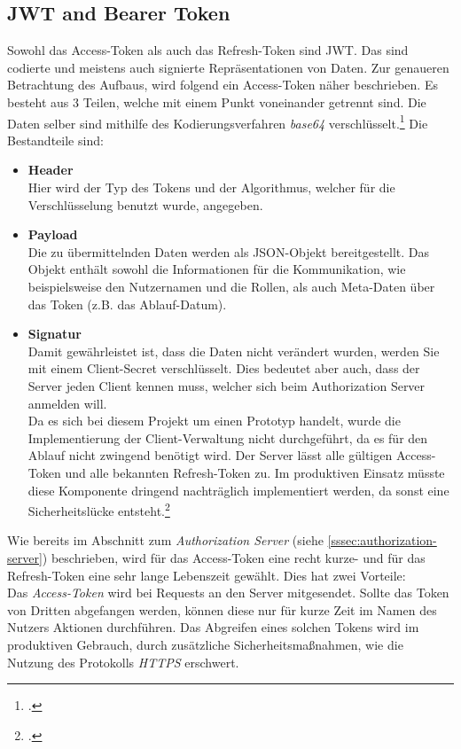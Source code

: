 \subsection{JWT and Bearer Token}
\label{ssec:jwt-bearer}
Sowohl das Access-Token als auch das Refresh-Token sind \ac{JWT}. Das sind codierte und meistens auch signierte Repräsentationen von Daten. Zur genaueren Betrachtung des Aufbaus, wird folgend ein Access-Token näher beschrieben. Es besteht aus 3 Teilen, welche mit einem Punkt voneinander getrennt sind. Die Daten selber sind mithilfe des Kodierungsverfahren \textit{base64} verschlüsselt.\footcite[S. 289]{book:AngularJs:Steyer2015} Die Bestandteile sind:
\begin{itemize}
\item \textbf{Header}\\Hier wird der Typ des Tokens und der Algorithmus, welcher für die Verschlüsselung benutzt wurde, angegeben. 
\item \textbf{Payload} \\Die zu übermittelnden Daten werden als \ac{JSON}-Objekt bereitgestellt. Das Objekt enthält sowohl die Informationen für die Kommunikation, wie beispielsweise den Nutzernamen und die Rollen, als auch Meta-Daten über das Token (z.B. das Ablauf-Datum).
\item \textbf{Signatur}\\Damit gewährleistet ist, dass die Daten nicht verändert wurden, werden Sie mit einem Client-Secret verschlüsselt. Dies bedeutet aber auch, dass der Server jeden Client kennen muss, welcher sich beim Authorization Server anmelden will. \\
Da es sich bei diesem Projekt um einen Prototyp handelt, wurde die Implementierung der Client-Verwaltung nicht durchgeführt, da es für den Ablauf nicht zwingend benötigt wird. Der Server lässt alle gültigen Access-Token und alle bekannten Refresh-Token zu. Im produktiven Einsatz müsste diese Komponente dringend nachträglich implementiert werden, da sonst eine Sicherheitslücke entsteht.\footcite{online:understanding-jwt}
\end{itemize}
Wie bereits im Abschnitt zum \textit{Authorization Server} (siehe \ref{sssec:authorization-server}) beschrieben, wird für das Access-Token eine recht kurze- und für das Refresh-Token eine sehr lange Lebenszeit gewählt. Dies hat zwei Vorteile:\\
Das \textit{Access-Token} wird bei Requests an den Server mitgesendet. Sollte das Token von Dritten abgefangen werden, können diese nur für kurze Zeit im Namen des Nutzers Aktionen durchführen. Das Abgreifen eines solchen Tokens wird im produktiven Gebrauch, durch zusätzliche Sicherheitsmaßnahmen, wie die Nutzung des Protokolls \textit{\ac{HTTPS}} erschwert. \\
